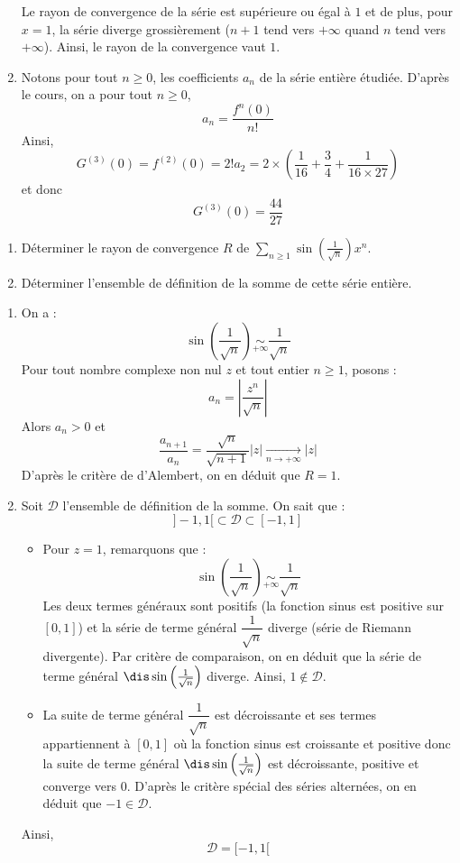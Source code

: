 \documentclass[a4paper,10pt]{report}
\newcommand{\Sum}[2]{\ensuremath{\textstyle{\sum\limits_{#1}^{#2}}}}
\begin{document}
\begin{enumerate}
Le rayon de convergence de la série est supérieure ou égal à $1$ et de plus, pour $x=1$, la série diverge grossièrement ($n+1$ tend vers $+ \infty$ quand $n$ tend vers $+ \infty$). Ainsi, le rayon de la convergence vaut $1$.
\item Notons pour tout $n \geq 0$, les coefficients $a_n$ de la série entière étudiée.  D'après le cours, on a pour tout $n \geq 0$,
$$ a_n = \dfrac{f^n(0)}{n!}$$
Ainsi,
$$G^{(3)}(0)=f^{(2)}(0)=2!a_2=2\times\left(\dfrac{1}{16} +\dfrac{3}{4}+\dfrac{1}{16\times 27}\right)$$
et donc
$$ G^{(3)}(0)=\dfrac{44}{27}$$
\end{enumerate}

\begin{Exercice}{} \begin{enumerate}
\item Déterminer le rayon de convergence $R$ de $\Sum{n \geq 1}{} \sin \left( \frac{1}{\sqrt{n}} \right) x^n$.
\item Déterminer l'ensemble de définition de la somme de cette série entière.
\end{enumerate}
\end{Exercice}

\corr 

\begin{enumerate}
\item On a :
$$ \sin \left( \frac{1}{\sqrt{n}} \right) \underset{+ \infty}{\sim} \dfrac{1}{\sqrt{n}}$$
Pour tout nombre complexe non nul $z$ et tout entier $n \geq 1$, posons :
$$  a_n = \left\vert \dfrac{z^n}{ \sqrt{n}} \right\vert$$
Alors $a_n>0$ et 
$$ \dfrac{a_{n+1}}{a_n} = \dfrac{\sqrt{n}}{\sqrt{n+1}} \vert z \vert \underset{ n \rightarrow+ \infty}{\longrightarrow} \vert z \vert$$
D'après le critère de d'Alembert, on en déduit que $R=1$.
\item Soit $\mathcal{D}$ l'ensemble de définition de la somme. On sait que : 
$$ ]-1,1[ \subset \mathcal{D} \subset [-1,1]$$
\begin{itemize}
\item Pour $z=1$, remarquons que :
$$ \sin \left( \frac{1}{\sqrt{n}} \right) \underset{+ \infty}{\sim} \dfrac{1}{\sqrt{n}} $$
Les deux termes généraux sont positifs (la fonction sinus est positive sur $[0,1]$) et la série de terme général $\dfrac{1}{\sqrt{n}}$ diverge (série de Riemann divergente). Par critère de comparaison, on en déduit que la série de terme général $\dis \sin \left( \frac{1}{\sqrt{n}} \right)$ diverge. Ainsi, $1 \notin \mathcal{D}$.
\item La suite de terme général $\dfrac{1}{\sqrt{n}}$ est décroissante et ses termes appartiennent à $[0,1]$ où la fonction sinus est croissante et positive donc la suite de terme général $\dis \sin \left( \frac{1}{\sqrt{n}} \right)$ est décroissante, positive et converge vers $0$. D'après le critère spécial des séries alternées, on en déduit que $-1 \in \mathcal{D}$.
\end{itemize}
Ainsi,
$$ \mathcal{D}= [-1,1[$$
\end{enumerate}
\end{document}
